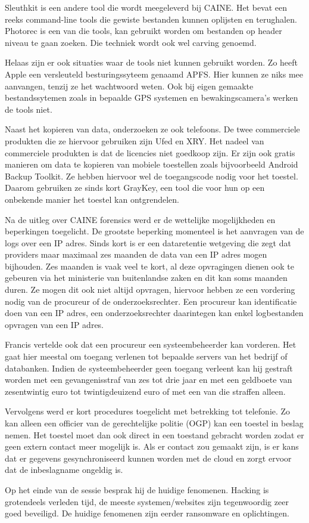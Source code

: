Sleuthkit is een andere tool die wordt meegeleverd bij CAINE. Het bevat een reeks command-line tools
die gewiste bestanden kunnen oplijsten en terughalen. Photorec is een van die tools, kan gebruikt
worden om bestanden op header niveau te gaan zoeken. Die techniek wordt ook wel carving genoemd.

Helaas zijn er ook situaties waar de tools niet kunnen gebruikt worden. Zo heeft Apple een
versleuteld besturingssyteem genaamd APFS. Hier kunnen ze niks mee aanvangen, tenzij ze het
wachtwoord weten. Ook bij eigen gemaakte bestandssytemen zoals in bepaalde GPS systemen en
bewakingscamera's werken de tools niet.

Naast het kopieren van data, onderzoeken ze ook telefoons. De twee commerciele produkten die ze
hiervoor gebruiken zijn Ufed en XRY. Het nadeel van commerciele produkten is dat de licencies niet
goedkoop zijn. Er zijn ook gratis manieren om data te kopieren van mobiele toestellen zoals
bijvoorbeeld Android Backup Toolkit. Ze hebben hiervoor wel de toegangscode nodig voor het toestel.
Daarom gebruiken ze sinds kort GrayKey, een tool die voor hun op een onbekende manier het toestel
kan ontgrendelen.

Na de uitleg over CAINE forensics werd er de wettelijke mogelijkheden en beperkingen toegelicht. De
grootste beperking momenteel is het aanvragen van de logs over een IP adres. Sinds kort is er een
dataretentie wetgeving die zegt dat providers maar maximaal zes maanden de data van een IP adres
mogen bijhouden. Zes maanden is vaak veel te kort, al deze opvragingen dienen ook te gebeuren via
het ministerie van buitenlandse zaken en dit kan soms maanden duren. Ze mogen dit ook niet altijd
opvragen, hiervoor hebben ze een vordering nodig van de procureur of de onderzoeksrechter. Een
procureur kan identificatie doen van een IP adres, een onderzoeksrechter daarintegen kan enkel
logbestanden opvragen van een IP adres. 

Francis vertelde ook dat een procureur een systeembeheerder kan vorderen. Het gaat hier meestal om
toegang verlenen tot bepaalde servers van het bedrijf of databanken. Indien de systeembeheerder geen
toegang verleent kan hij gestraft worden met een gevangenisstraf van zes tot drie jaar en met een
geldboete van zesentwintig euro tot twintigdeuizend euro of met een van die straffen alleen.

Vervolgens werd er kort procedures toegelicht met betrekking tot telefonie. Zo kan alleen een
officier van de gerechtelijke politie (OGP) kan een toestel in beslag nemen. Het toestel moet dan
ook direct in een toestand gebracht worden zodat er geen extern contact meer mogelijk is. Als er
contact zou gemaakt zijn, is er kans dat er gegevens gesynchroniseerd kunnen worden met de cloud en
zorgt ervoor dat de inbeslagname ongeldig is.

Op het einde van de sessie besprak hij de huidige fenomenen. Hacking is grotendeels verleden tijd,
de meeste systemen/websites zijn tegenwoordig zeer goed beveiligd. De huidige fenomenen zijn eerder
ransomware en oplichtingen.
